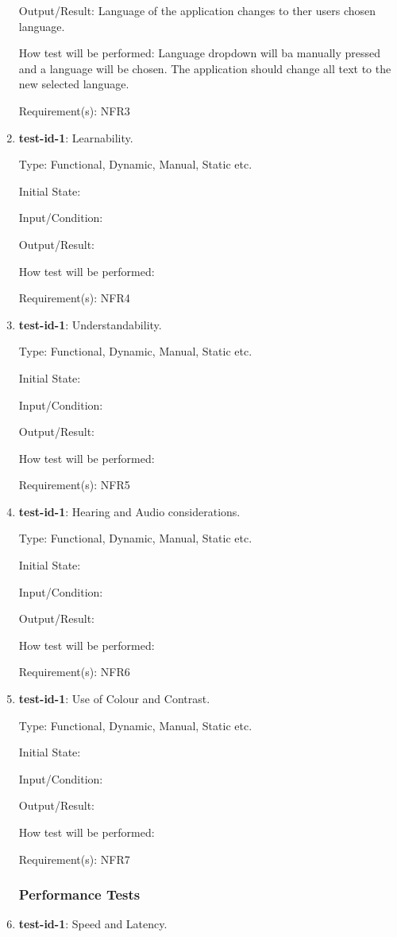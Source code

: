 \documentclass[12pt, titlepage]{article}
\begin{document}
\begin{enumerate}
		Output/Result: Language of the application changes to ther users chosen language.
		
		How test will be performed: Language dropdown will ba manually pressed and a language will be chosen. The application should change all text to the new selected language.
		
		Requirement(s): NFR3
		
		\item{\textbf{test-id-1}}: Learnability.
		
		Type: Functional, Dynamic, Manual, Static etc.
		
		Initial State: 
		
		Input/Condition: 
		
		Output/Result: 
		
		How test will be performed: 
		
		Requirement(s): NFR4
		
		\item{\textbf{test-id-1}}: Understandability.
		
		Type: Functional, Dynamic, Manual, Static etc.

		Initial State: 
		
		Input/Condition: 
		
		Output/Result: 
		
		How test will be performed: 
		
		Requirement(s): NFR5
		
		\item{\textbf{test-id-1}}: Hearing and Audio considerations.
		
		Type: Functional, Dynamic, Manual, Static etc.
		
		Initial State: 
		
		Input/Condition: 
		
		Output/Result: 
		
		How test will be performed: 
		
		Requirement(s): NFR6
		
		\item{\textbf{test-id-1}}: Use of Colour and Contrast.
		
		Type: Functional, Dynamic, Manual, Static etc.
		
		Initial State: 
		
		Input/Condition: 
		
		Output/Result: 
		
		How test will be performed: 
		
		Requirement(s): NFR7
	\subsubsection{Performance Tests}
		\item{\textbf{test-id-1}}: Speed and Latency.
		

\end{enumerate}
\end{document}
